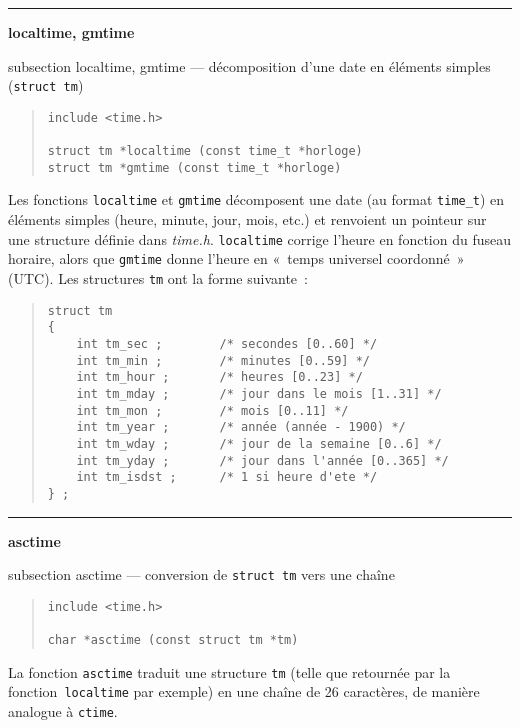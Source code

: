 \documentclass [twoside] {report}
\newcommand {\primitive} [1]
    {
	\phantomsection
	{\large \textbf {#1}}
	\addcontentsline {toc} {subsection} {#1}
    }
\newcommand {\separation}
    {
	\vspace {5mm}
	\nopagebreak
	\hrule
    }
\begin{document}
\separation
\primitive {localtime, gmtime} --- décomposition d'une date en éléments simples (\texttt {struct tm})

\begin {quote}
\begin {verbatim}
include <time.h>

struct tm *localtime (const time_t *horloge)
struct tm *gmtime (const time_t *horloge)
\end{verbatim}
\end {quote}


Les fonctions \texttt {localtime} et \texttt {gmtime} décomposent une date (au
format \texttt {time\_t}) en éléments simples (heure, minute, jour,
mois, etc.) et renvoient un pointeur sur une structure définie dans {\em
time.h}.  \texttt {localtime} corrige l'heure en fonction du fuseau horaire,
alors que \texttt {gmtime} donne l'heure en «~temps universel coordonné~»
(UTC).  Les structures \texttt {tm} ont la forme suivante~:
    \label {struct-tm}

\begin {quote}
\begin {verbatim}
struct tm
{
    int tm_sec ;        /* secondes [0..60] */
    int tm_min ;        /* minutes [0..59] */
    int tm_hour ;       /* heures [0..23] */
    int tm_mday ;       /* jour dans le mois [1..31] */
    int tm_mon ;        /* mois [0..11] */
    int tm_year ;       /* année (année - 1900) */
    int tm_wday ;       /* jour de la semaine [0..6] */
    int tm_yday ;       /* jour dans l'année [0..365] */
    int tm_isdst ;      /* 1 si heure d'ete */
} ;
\end{verbatim}
\end {quote}


\separation
\primitive {asctime} --- conversion de \texttt {struct tm} vers une chaîne

\begin {quote}
\begin {verbatim}
include <time.h>

char *asctime (const struct tm *tm)
\end{verbatim}
\end {quote}


La fonction \texttt {asctime} traduit une structure \texttt {tm} (telle que
retournée par la fonction~\texttt {localtime} par exemple) en une chaîne
de 26 caractères, de manière analogue à \texttt {ctime}.
\end{document}
